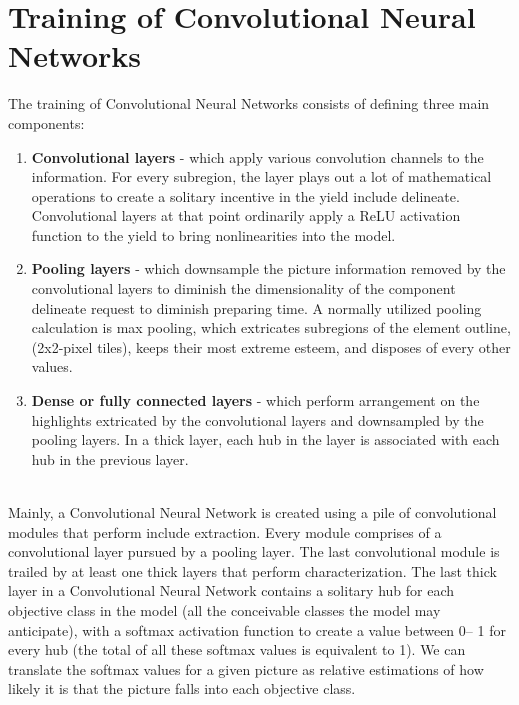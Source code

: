 \documentclass[12pt]{article}
\begin{document}

\section*{Training of Convolutional Neural Networks} 
\hspace*{10mm}The training of Convolutional Neural Networks consists of defining three main components:
\begin{enumerate}[1.]
	\item \textbf{Convolutional layers} - which apply various convolution channels to the information. For every subregion, the layer plays out a lot of mathematical operations to create a solitary incentive in the yield include delineate. Convolutional layers at that point ordinarily apply a ReLU activation function to the yield to bring nonlinearities into the model.
	\item \textbf{Pooling layers} - which downsample the picture information removed by the convolutional layers to diminish the dimensionality of the component delineate request to diminish preparing time. A normally utilized pooling calculation is max pooling, which extricates subregions of the element outline, (2x2-pixel tiles), keeps their most extreme esteem, and disposes of every other values.
	\item \textbf{Dense or fully connected layers} - which perform arrangement on the highlights extricated by the convolutional layers and downsampled by the pooling layers. In a thick layer, each hub in the layer is associated with each hub in the previous layer.
\end{enumerate}
\hspace*{10mm} \\ \hspace*{10mm}Mainly, a Convolutional Neural Network is created using a pile of convolutional modules that perform include extraction. Every module comprises of a convolutional layer pursued by a pooling layer. The last convolutional module is trailed by at least one thick layers that perform characterization. The last thick layer in a Convolutional Neural Network contains a solitary hub for each objective class in the model (all the conceivable classes the model may anticipate), with a softmax activation function to create a value between 0– 1 for every hub (the total of all these softmax values is equivalent to 1). We can translate the softmax values for a given picture as relative estimations of how likely it is that the picture falls into each objective class.
\end{document}
